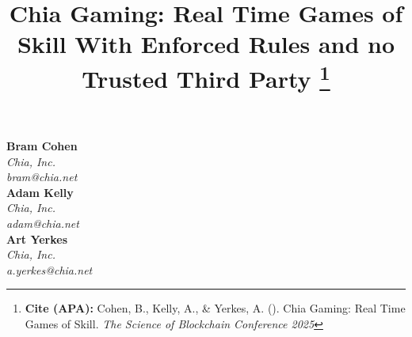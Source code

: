 \documentclass[a4paper]{article}
\title{
    \textbf{Chia Gaming: Real Time Games of Skill With Enforced Rules and no Trusted Third Party} 
    \thanks{
        \sloppy
        \textbf{Cite (APA):} Cohen, B., Kelly, A., \& Yerkes, A. (\the\year). Chia Gaming: Real Time Games of Skill. \textit{The Science of Blockchain Conference 2025}
    }
}
\date{} %
\renewcommand*{\arraystretch}{1.1}
\begin{document}
\newcommand*{\mline}[1]{%
\begingroup
    \renewcommand*{\arraystretch}{1.1}%
   \begin{tabular}[c]{@{}>{\raggedright\arraybackslash}p{2cm}@{}}#1\end{tabular}%
  \endgroup
}


\maketitle
\vspace{-1.5cm}
\thispagestyle{firstpage}

\begin{multicols}{3}
	\centering
	\textbf{Bram Cohen}\\
	\textit{Chia, Inc.}\\
	\textit{bram@chia.net}\\
	\vfill
        \textbf{Adam Kelly}\\
	\textit{Chia, Inc.}\\
	\textit{adam@chia.net}\\
	\vfill
        \textbf{Art Yerkes}\\
	\textit{Chia, Inc.}\\
	\textit{a.yerkes@chia.net}\\
	\vfill
\end{multicols}

\singlespacing
\setlength{\parskip}{6pt}
\setlength{\parindent}{0.5cm}
\end{document}
